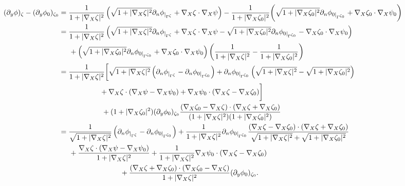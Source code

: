 \documentclass[11pt]{article}
\begin{document}
\begin{equation*}
	\begin{split}
		(\partial_y\phi)_{\zeta}-(\partial_y\phi_0)_{\zeta_0}&=\frac{1}{1+|\nabla_X\zeta|^2}\left(\sqrt{1+|\nabla_X\zeta|^2}\partial_n\phi_{|_{\Gamma^{\zeta
		}}}+\nabla_X\zeta\cdot\nabla_X\psi\right)-\frac{1}{1+|\nabla_X\zeta_0|^2}\bigg(\sqrt{1+|\nabla_X\zeta_0|^2}\partial_n\phi_{0|_{\Gamma^{\zeta_0
		}}}+\nabla_X\zeta_0\cdot\nabla_X\psi_0\bigg)\\
		&=\frac{1}{1+|\nabla_X\zeta|^2}\left(\sqrt{1+|\nabla_X\zeta|^2}\partial_n\phi_{|_{\Gamma^{\zeta
		}}}+\nabla_X\zeta\cdot\nabla_X\psi -\sqrt{1+|\nabla_X\zeta_0|^2}\partial_n\phi_{0|_{\Gamma^{\zeta_0
		}}}-\nabla_X\zeta_0\cdot\nabla_X\psi_0 \right)\\
		&\hspace{0.5cm}+\left(\sqrt{1+|\nabla_X\zeta_0|^2}\partial_n\phi_{0|_{\Gamma^{\zeta_0
		}}}+\nabla_X\zeta_0\cdot\nabla_X\psi_0\right)\left( \frac{1}{1+|\nabla_X\zeta|^2}-\frac{1}{1+|\nabla_X\zeta_0|^2}\right)\\
		&=\frac{1}{1+|\nabla_X\zeta|^2}\bigg[ \sqrt{1+|\nabla_X\zeta|^2}\left(\partial_n\phi_{|_{\Gamma^{\zeta
		}}}-\partial_n\phi_{0|_{\Gamma^{\zeta_0
		}}}\right)+\partial_n\phi_{0|_{\Gamma^{\zeta_0
		}}}\left(\sqrt{1+|\nabla_X\zeta|^2}-\sqrt{1+|\nabla_X\zeta_0|^2}\right) \\
		&\hspace{2cm}+ \nabla_X\zeta\cdot\left(\nabla_X\psi-\nabla_X\psi_0\right)+\nabla_X\psi_0\cdot(\nabla_X\zeta-\nabla_X\zeta_0)             \bigg]\\
		&\hspace{2.1cm}+(1+|\nabla_X\zeta_0|^2)(\partial_y\phi_0)_{\zeta_0}\frac{(\nabla_X\zeta_0-\nabla_X\zeta)\cdot(\nabla_X\zeta+\nabla_X\zeta_0)}{(1+|\nabla_X\zeta|^2)(1+|\nabla_X\zeta_0|^2)}\\
		&=\frac{1}{\sqrt{1+|\nabla_X\zeta|^2}}\left(\partial_n\phi_{|_{\Gamma^{\zeta
		}}}-\partial_n\phi_{0|_{\Gamma^{\zeta_0
		}}}\right)+\frac{1}{1+|\nabla_X\zeta|^2}\partial_n\phi_{0|_{\Gamma^{\zeta_0}}}\frac{(\nabla_X\zeta-\nabla_X\zeta_0)\cdot(\nabla_X\zeta+\nabla_X\zeta_0)}{\sqrt{1+|\nabla_X\zeta|^2}+\sqrt{1+|\nabla_X\zeta_0|^2}}\\
		&\hspace{0.5cm}+\frac{\nabla_X\zeta\cdot(\nabla_X\psi-\nabla_X\psi_0)}{1+|\nabla_X\zeta|^2}+\frac{1}{1+|\nabla_X\zeta|^2}\nabla_X\psi_0\cdot(\nabla_X\zeta-\nabla_X\zeta_0)\\&\hspace{3cm}+\frac{(\nabla_X\zeta+\nabla_X\zeta_0)\cdot(\nabla_X\zeta_0-\nabla_X\zeta)}{1+|\nabla_X\zeta|^2}(\partial_y\phi_0)_{\zeta_0}.
	\end{split}
\end{equation*}
\end{document}
